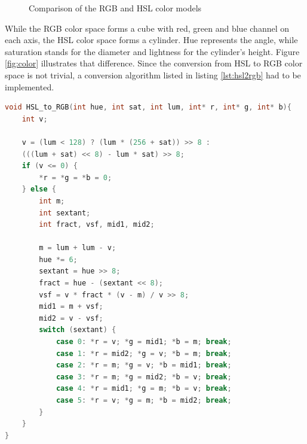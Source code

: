 \begin{figure}[bth]
	\myfloatalign
	 \quad
	\caption{Comparison of the RGB and \ac{HSL} color models} %
\end{figure}

While the RGB color space forms a cube with red, green and blue channel on each axis, the \ac{HSL} color space forms a cylinder. Hue represents the angle, while saturation stands for the diameter and lightness for the cylinder's height. Figure \ref{fig:color} illustrates that difference. Since the conversion from \ac{HSL} to RGB color space is not trivial, a conversion algorithm listed in listing \ref{lst:hsl2rgb} had to be implemented.

\begin{lstlisting}[label=lst:resample,language=c,frame=lt,caption=Converting from the RGB color space to the \ac{HSL} color space]
void HSL_to_RGB(int hue, int sat, int lum, int* r, int* g, int* b){
	int v;
	
	v = (lum < 128) ? (lum * (256 + sat)) >> 8 :
	(((lum + sat) << 8) - lum * sat) >> 8;
	if (v <= 0) {
		*r = *g = *b = 0;
	} else {
		int m;
		int sextant;
		int fract, vsf, mid1, mid2;
		
		m = lum + lum - v;
		hue *= 6;
		sextant = hue >> 8;
		fract = hue - (sextant << 8);
		vsf = v * fract * (v - m) / v >> 8;
		mid1 = m + vsf;
		mid2 = v - vsf;
		switch (sextant) {
			case 0: *r = v; *g = mid1; *b = m; break;
			case 1: *r = mid2; *g = v; *b = m; break;
			case 2: *r = m; *g = v; *b = mid1; break;
			case 3: *r = m; *g = mid2; *b = v; break;
			case 4: *r = mid1; *g = m; *b = v; break;
			case 5: *r = v; *g = m; *b = mid2; break;
		}
	}
}
\end{lstlisting}

